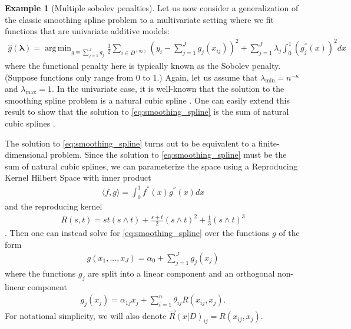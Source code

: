 \documentclass[12pt]{article} %
\theoremstyle{definition}
\newtheorem{example}{Example}
\DeclareMathOperator*{\argmin}{arg\,min}
\begin{document}
\begin{example}[Multiple sobolev penalties]
	Let us now consider a generalization of the classic smoothing spline problem to a multivariate setting where we fit functions that are univariate additive models:
	\begin{align}
	\hat{g}(\boldsymbol{\lambda})
	= \argmin_{g \equiv \sum_{j=1}^J g_j}
	\frac{1}{2} \sum_{i\in D^{(n_T)}}
	\left(
	y_i - \sum_{j=1}^J g_j(x_{ij})
	\right)^2
	+ \sum_{j=1}^{J} \lambda_j \int_0^1 \left(g_j^{''}(x)\right)^{2} dx
	\label{eq:smoothing_spline}
	\end{align}
	where the functional penalty here is typically known as the Sobolev penalty.
	(Suppose functions only range from 0 to 1.)
	Again, let us assume that $\lambda_{\min} = n^{-\kappa}$ and $\lambda_{\max} = 1$.
	In the univariate case, it is well-known that the solution to the smoothing spline problem is a natural cubic spline \citep{green1993nonparametric, o1986automatic}.
	One can easily extend this result to show that the solution to \eqref{eq:smoothing_spline} is the sum of natural cubic splines \citep{buja1989linear}.

	The solution to \eqref{eq:smoothing_spline} turns out to be equivalent to a finite-dimensional problem.
	Since the solution to \eqref{eq:smoothing_spline} must be the sum of natural cubic splines, we can parameterize the space using a Reproducing Kernel Hilbert Space with inner product
	\begin{align}
	\langle f, g \rangle = \int_{0}^1 f^{''}(x) g^{''}(x) dx
	\end{align}
	and the reproducing kernel
	\begin{align}
	R(s, t) = st(s \wedge t)
	+ \frac{s + t}{2} (s \wedge t)^2
	+ \frac{1}{3}
	(s \wedge t)^3
	\end{align}
	\citep{heckman2012theory}.
	Then one can instead solve for \eqref{eq:smoothing_spline} over the functions $g$ of the form
	\begin{align}
	g(x_1,..., x_J) = \alpha_0 + \sum_{j=1}^J g_j(x_j)
	\end{align}
	where the functions $g_j$ are split into a linear component and an orthogonal non-linear component
	\begin{align}
	g_j(x_j) = \alpha_{1j} x_j + \sum_{i=1}^n \theta_{ij} R(x_{ij}, x_j).
	\end{align}
	For notational simplicity, we will also denote $\vec{R}(x | D)_{ij} = R(x_{ij}, x_j)$.


\end{example}
\end{document}
